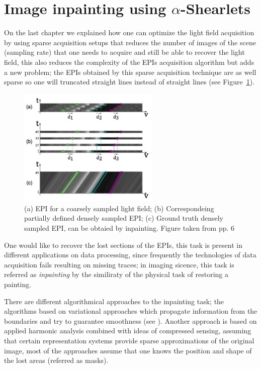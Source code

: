 \section{Image inpainting using $\alpha$-Shearlets}

On the last chapter we explained how one can optimize the light field acquisition by using sparse acquisition setups that reduces the number of images of the scene (sampling rate) that one needs to acquire and still be able to recover the light field, this also reduces the complexity of the EPIs acquisition algorithm but adds a new problem; the EPIs obtained by this sparse acquisition technique are as well sparse so one will truncated straight lines instead of straight lines (see Figure~\ref{fig:sparse_EPI}). 

\begin{figure}[h!]
\centering
\includegraphics[width=0.6\textwidth]{./Diagrams/sparse_EPI.jpg}
\caption{(a) EPI for a coarsely sampled light field; (b) Correspondeing partially defined densely sampled EPI; (c) Ground truth densely sampled EPI, can be obtaied by inpainting. Figure taken from \cite{LF-Shearlets} pp. 6}
\label{fig:sparse_EPI}
\end{figure}

One would like to recover the lost sections of the EPIs, this task is present in different applications on data processing, since frequently the technologies of data acquisition fails resulting on missing traces; in imaging sicence, this task is referred as \textit{inpainting} by the similiraty of the physical task of restoring a painting. 

\bigskip

There are different algorithmical approaches to the inpainting task; the algorithms based on variational approaches which propagate information from the boundaries and try to guarantee smoothness (see \cite{Ballester}). Another approach is based on applied harmonic analysis combined with ideas of compressed sensing, assuming that certain representation systems provide sparse approximations of the original image, most of the approaches assume that one knows the position and shape of the lost areas (referred as masks).

